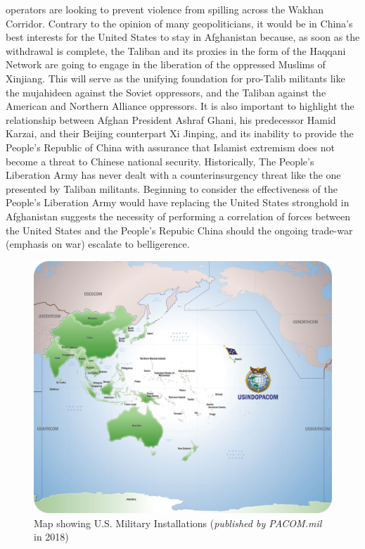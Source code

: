 \documentclass[12pt]{article}
\begin{document}
operators are looking to prevent violence from spilling across the Wakhan Corridor. Contrary to the opinion of many geopoliticians, it would be in China's best interests for the United States to stay in Afghanistan because, as soon as the withdrawal is complete, the Taliban and its proxies in the form of the Haqqani Network are going to engage in the liberation of the oppressed Muslims of Xinjiang. This will serve as the unifying foundation for pro-Talib militants like the mujahideen against the Soviet oppressors, and the Taliban against the American and Northern Alliance oppressors. It is also important to highlight the relationship between Afghan President Ashraf Ghani, his predecessor Hamid Karzai, and their Beijing counterpart Xi Jinping, and its inability to provide the People's Republic of China with assurance that Islamist extremism does not become a threat to Chinese national security. Historically, The People's Liberation Army has never dealt with a counterinsurgency threat like the one presented by Taliban militants. Beginning to consider the effectiveness of the People's Liberation Army would have replacing the United States stronghold in Afghanistan suggests the necessity of performing a correlation of forces between the United States and the People's Repubic China should the ongoing trade-war (emphasis on war) escalate to belligerence.

\begin{figure}[h!]
  \centering
  \includegraphics[width=\textwidth]{Images/USINDOPACOM.jpg}
  \caption{Map showing U.S. Military Installations (\footnotesize{\emph{published by PACOM.mil} in 2018})}
  \label{fig:fig2}
\end{figure}
\end{document}
